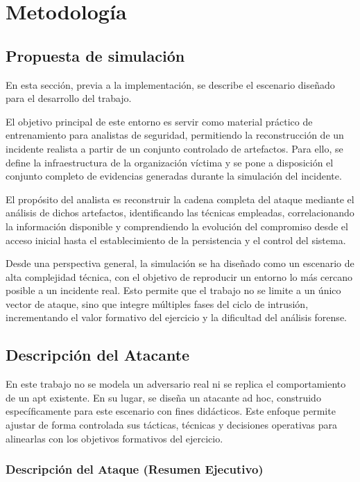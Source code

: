\chapter{Metodología}
\label{chap:metodologia}

\section{Propuesta de simulación}

En esta sección, previa a la implementación, se describe el escenario diseñado para el desarrollo del trabajo.

El objetivo principal de este entorno es servir como material práctico de entrenamiento para analistas de seguridad, permitiendo la reconstrucción de un incidente realista a partir de un conjunto controlado de artefactos. Para ello, se define la infraestructura de la organización víctima y se pone a disposición el conjunto completo de evidencias generadas durante la simulación del incidente.

El propósito del analista es reconstruir la cadena completa del ataque mediante el análisis de dichos artefactos, identificando las técnicas empleadas, correlacionando la información disponible y comprendiendo la evolución del compromiso desde el acceso inicial hasta el establecimiento de la persistencia y el control del sistema.

Desde una perspectiva general, la simulación se ha diseñado como un escenario de alta complejidad técnica, con el objetivo de reproducir un entorno lo más cercano posible a un incidente real. Esto permite que el trabajo no se limite a un único vector de ataque, sino que integre múltiples fases del ciclo de intrusión, incrementando el valor formativo del ejercicio y la dificultad del análisis forense.

\section{Descripción del Atacante}

En este trabajo no se modela un adversario real ni se replica el comportamiento de un \acrshort{apt} existente. En su lugar, se diseña un atacante ad hoc, construido específicamente para este escenario con fines didácticos. Este enfoque permite ajustar de forma controlada sus tácticas, técnicas y decisiones operativas para alinearlas con los objetivos formativos del ejercicio.

\subsection{Descripción del Ataque (Resumen Ejecutivo)}

